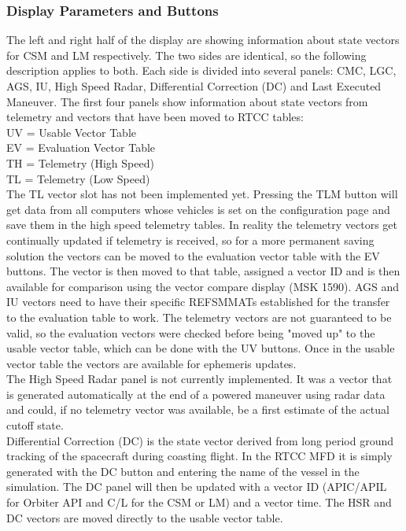 \documentclass[11pt]{article} %
\begin{document}
\subsubsection{Display Parameters and Buttons}

The left and right half of the display are showing information about state vectors for CSM and LM respectively. The two sides are identical, so the following description applies to both. Each side is divided into several panels: CMC, LGC, AGS, IU, High Speed Radar, Differential Correction (DC) and Last Executed Maneuver. The first four panels show information about state vectors from telemetry and vectors that have been moved to RTCC tables:\\

UV = Usable Vector Table\\
EV = Evaluation Vector Table\\
TH = Telemetry (High Speed)\\
TL = Telemetry (Low Speed)\\

The TL vector slot has not been implemented yet. Pressing the TLM button will get data from all computers whose vehicles is set on the configuration page and save them in the high speed telemetry tables. In reality the telemetry vectors get continually updated if telemetry is received, so for a more permanent saving solution the vectors can be moved to the evaluation vector table with the EV buttons. The vector is then moved to that table, assigned a vector ID and is then available for comparison using the vector compare display (MSK 1590). AGS and IU vectors need to have their specific REFSMMATs established for the transfer to the evaluation table to work. The telemetry vectors are not guaranteed to be valid, so the evaluation vectors were checked before being "moved up" to the usable vector table, which can be done with the UV buttons. Once in the usable vector table the vectors are available for ephemeris updates.\\

The High Speed Radar panel is not currently implemented. It was a vector that is generated automatically at the end of a powered maneuver using radar data and could, if no telemetry vector was available, be a first estimate of the actual cutoff state.\\

Differential Correction (DC) is the state vector derived from long period ground tracking of the spacecraft during coasting flight. In the RTCC MFD it is simply generated with the DC button and entering the name of the vessel in the simulation. The DC panel will then be updated with a vector ID (APIC/APIL for Orbiter API and C/L for the CSM or LM) and a vector time. The HSR and DC vectors are moved directly to the usable vector table.\\
\end{document}
